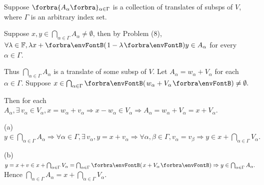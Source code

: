\documentclass[a4paper, 11pt, UTF8]{article}
\begin{document}
\begin{large}
\par\quad
Suppose $\Bra{A_{\alpha}}{_{\alpha\in\Gamma}}$ is a collection of translates of subsps of $V$, where $\Gamma$ is an arbitrary index set.\vspace{8pt}\par\quad
Suppose $x,y\in\bigcap_{\alpha\in\Gamma}A_{\alpha}\neq\emptyset$, then by Problem (8), $\forall\lambda\in\Fbb,\lambda x+\Par{1-\lambda}y\in A_{\alpha}$ for every $\alpha\in\Gamma$.\par\quad
Thus $\bigcap_{\alpha\in\Gamma}A_\alpha$ is a translate of some subsp of $V$.\PfEnd\vspace{6pt}\quad
\Or Let $A_\alpha=w_\alpha+V_\alpha$ for each $\alpha\in\Gamma$. Suppose $x\in\bigcap_{\alpha\in\Gamma}\Par{w_\alpha+V_\alpha}\neq\emptyset.$\par\quad
Then for each $A_\alpha,\exists\,v_\alpha\in V_\alpha,x=w_\alpha+v_\alpha\Rightarrow x-w_\alpha\in V_\alpha\Rightarrow A_\alpha=w_\alpha+V_\alpha=x+V_\alpha.$\vspace{3pt}\par\quad
(a) $y\in\bigcap_{\alpha\in\Gamma}A_\alpha\Rightarrow\forall\alpha\in\Gamma,\exists\,v_\alpha,y=x+v_\alpha\Rightarrow\forall\alpha,\beta\in\Gamma,v_\alpha=v_\beta\Rightarrow y\in x+\bigcap_{\alpha\in\Gamma}V_\alpha.$\vspace{3pt}\par\quad
(b) $y=x+v\in x+\bigcap_{\alpha\in\Gamma}V_\alpha=\bigcap_{\alpha\in\Gamma}\Par{x+V_\alpha}\Rightarrow y\in\bigcap_{\alpha\in\Gamma}A_\alpha.$ Hence $\bigcap_{\alpha\in\Gamma}A_\alpha=x+\bigcap_{\alpha\in\Gamma}V_\alpha.$\PfEnd
\SepLine\pagebreak


\end{large}
\end{document}

